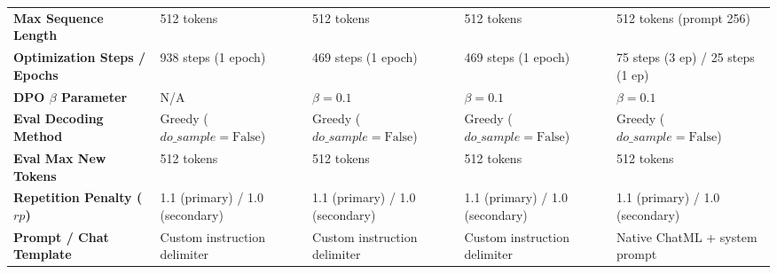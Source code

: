 \begin{table}[t]
\begin{tabularx}{\textwidth}{lXXXX}
\textbf{Max Sequence Length} & 512 tokens & 512 tokens & 512 tokens & 512 tokens (prompt 256) \\
\textbf{Optimization Steps / Epochs} & 938 steps (1 epoch) & 469 steps (1 epoch) & 469 steps (1 epoch) & 75 steps (3 ep) / 25 steps (1 ep) \\
\textbf{DPO $\beta$ Parameter} & N/A & $\beta = 0.1$ & $\beta = 0.1$ & $\beta = 0.1$ \\
\midrule
\textbf{Eval Decoding Method} & Greedy ($do\_sample=\text{False}$) & Greedy ($do\_sample=\text{False}$) & Greedy ($do\_sample=\text{False}$) & Greedy ($do\_sample=\text{False}$) \\
\textbf{Eval Max New Tokens} & 512 tokens & 512 tokens & 512 tokens & 512 tokens \\
\textbf{Repetition Penalty ($rp$)} & 1.1 (primary) / 1.0 (secondary) & 1.1 (primary) / 1.0 (secondary) & 1.1 (primary) / 1.0 (secondary) & 1.1 (primary) / 1.0 (secondary) \\
\textbf{Prompt / Chat Template} & Custom instruction delimiter & Custom instruction delimiter & Custom instruction delimiter & Native ChatML + system prompt \\
\bottomrule
\end{tabularx}
\end{table}
